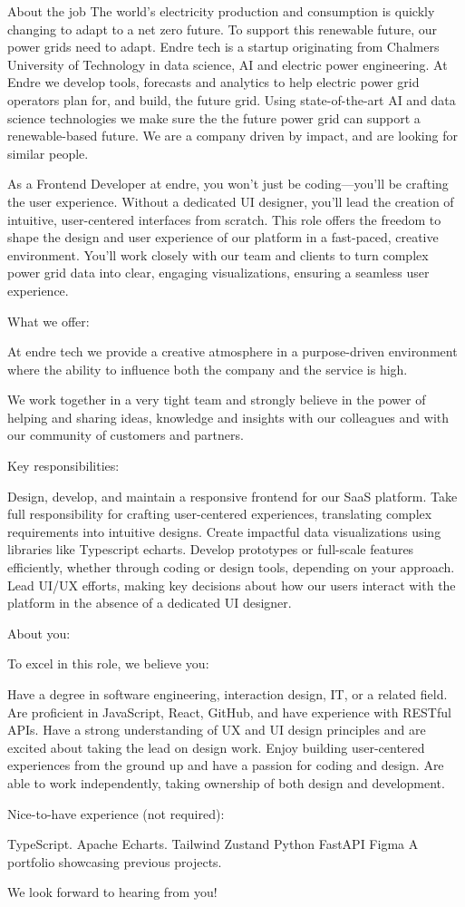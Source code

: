 About the job
The world’s electricity production and consumption is quickly changing to adapt to a net zero future. To support this renewable future, our power grids need to adapt. Endre tech is a startup originating from Chalmers University of Technology in data science, AI and electric power engineering. At Endre we develop tools, forecasts and analytics to help electric power grid operators plan for, and build, the future grid. Using state-of-the-art AI and data science technologies we make sure the the future power grid can support a renewable-based future. We are a company driven by impact, and are looking for similar people.



As a Frontend Developer at endre, you won’t just be coding—you’ll be crafting the user experience. Without a dedicated UI designer, you'll lead the creation of intuitive, user-centered interfaces from scratch. This role offers the freedom to shape the design and user experience of our platform in a fast-paced, creative environment. You'll work closely with our team and clients to turn complex power grid data into clear, engaging visualizations, ensuring a seamless user experience.



What we offer:

At endre tech we provide a creative atmosphere in a purpose-driven environment where the ability to influence both the company and the service is high.

We work together in a very tight team and strongly believe in the power of helping and sharing ideas, knowledge and insights with our colleagues and with our community of customers and partners.



Key responsibilities:

Design, develop, and maintain a responsive frontend for our SaaS platform.
Take full responsibility for crafting user-centered experiences, translating complex requirements into intuitive designs.
Create impactful data visualizations using libraries like Typescript echarts.
Develop prototypes or full-scale features efficiently, whether through coding or design tools, depending on your approach.
Lead UI/UX efforts, making key decisions about how our users interact with the platform in the absence of a dedicated UI designer.


About you:

To excel in this role, we believe you:

Have a degree in software engineering, interaction design, IT, or a related field.
Are proficient in JavaScript, React, GitHub, and have experience with RESTful APIs.
Have a strong understanding of UX and UI design principles and are excited about taking the lead on design work.
Enjoy building user-centered experiences from the ground up and have a passion for coding and design.
Are able to work independently, taking ownership of both design and development.


Nice-to-have experience (not required):

TypeScript.
Apache Echarts.
Tailwind
Zustand
Python
FastAPI
Figma
A portfolio showcasing previous projects.




We look forward to hearing from you!